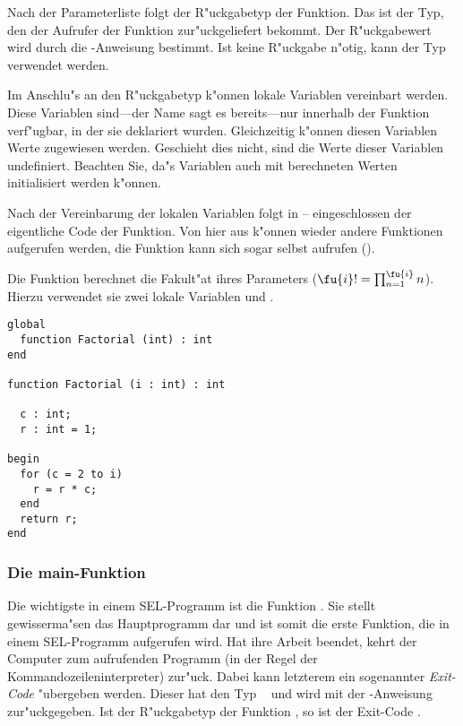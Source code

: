 Nach der Parameterliste folgt der R"uckgabetyp
der Funktion. Das ist der Typ, den der Aufrufer der Funktion
zur"uckgeliefert bekommt. Der R"uckgabewert wird durch die
-Anweisung bestimmt. Ist keine R"uckgabe n"otig, kann
der Typ \tvoid\
verwendet werden.

Im Anschlu"s an den R"uckgabetyp k"onnen lokale
Variablen
vereinbart werden. Diese Variablen sind---der Name
sagt es bereits---nur innerhalb der Funktion verf"ugbar, in der
sie deklariert wurden. Gleichzeitig k"onnen diesen Variablen
Werte zugewiesen werden. Geschieht dies nicht, sind die Werte
dieser Variablen undefiniert. Beachten Sie, da"s Variablen
auch mit berechneten Werten initialisiert werden k"onnen.

Nach der Vereinbarung der lokalen Variablen folgt in
--
eingeschlossen der eigentliche Code der
Funktion. Von hier aus k"onnen wieder andere Funktionen
aufgerufen werden, die Funktion kann sich sogar selbst aufrufen
().

\example
Die Funktion  berechnet die Fakult"at
ihres Parameters 
(\hbox{$\fu{i}! = \prod_{n=1}^{\fu{\footnotesize i}} n$}).
Hierzu verwendet sie zwei lokale Variablen  und .

\begin{verbatim}
global
  function Factorial (int) : int
end

function Factorial (i : int) : int

  c : int;
  r : int = 1;

begin
  for (c = 2 to i)
    r = r * c;
  end
  return r;
end
\end{verbatim}

\subsubsection{Die main-Funktion}
Die wichtigste  in einem SEL-Programm ist die Funktion
\fuii{main}. Sie stellt gewisserma"sen das Hauptprogramm dar und
ist somit die erste Funktion, die in einem SEL-Programm aufgerufen
wird. Hat \fu{main} ihre Arbeit beendet, kehrt der Computer zum
aufrufenden Programm (in der Regel der Kommandozeileninterpreter)
zur"uck. Dabei kann letzterem ein sogenannter {\em Exit-Code}
"ubergeben werden. Dieser  hat den Typ \tint\
und wird mit der \rwi{return}-Anweisung zur"uckgegeben. Ist der
R"uckgabetyp der Funktion  \tvoid ,
\typeindex{void}
so ist der Exit-Code .

